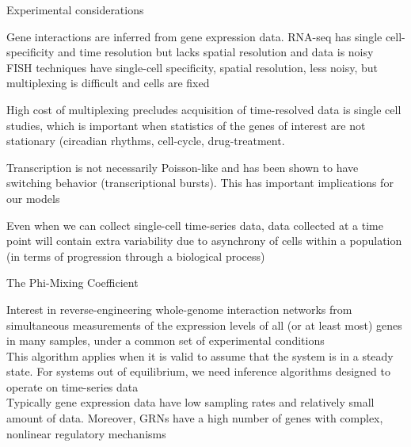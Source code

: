\documentclass[aspectratio=1610]{beamer}					%
\begin{document}
\begin{frame}{Experimental considerations}

Gene interactions are inferred from gene expression data. RNA-seq has single cell-specificity and time resolution but lacks spatial resolution and data is noisy\\
\vspace{0.2in}
FISH techniques have single-cell specificity, spatial resolution, less noisy, but multiplexing is difficult and cells are fixed\\
\vspace{0.2in}

High cost of multiplexing precludes acquisition of time-resolved data is single cell studies, which is important when statistics of the genes of interest are not stationary (circadian rhythms, cell-cycle, drug-treatment.\\
\vspace{0.2in}

Transcription is not necessarily Poisson-like and has been shown to have switching behavior (transcriptional bursts). This has important implications for our models\\
\vspace{0.2in}

Even when we can collect single-cell time-series data, data collected at a time point will contain extra variability due to asynchrony of cells within a population (in terms of progression through a biological process)\\

\end{frame}

\begin{frame}{The Phi-Mixing Coefficient}

Interest in reverse-engineering whole-genome interaction networks from simultaneous measurements of the
expression levels of all (or at least most) genes in many
samples, under a common set of experimental conditions\\
\vspace{0.2in}
This algorithm applies when it is valid to assume that the system is in a steady state. For systems out of equilibrium, we need inference algorithms designed to operate on time-series data\\
\vspace{0.2in}
Typically gene expression data have low sampling rates and relatively small
amount of data. Moreover, GRNs have a high number of genes
with complex, nonlinear regulatory mechanisms

\end{frame}
\end{document}
